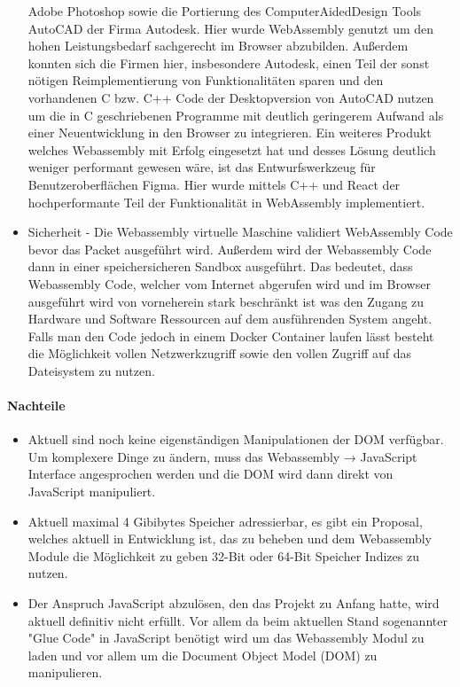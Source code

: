 \begin{itemize}
            Adobe Photoshop sowie die Portierung des ComputerAidedDesign Tools AutoCAD der Firma Autodesk. Hier wurde WebAssembly genutzt um den hohen Leistungsbedarf sachgerecht im Browser abzubilden.
            Außerdem konnten sich die Firmen hier, insbesondere Autodesk, einen Teil der sonst nötigen Reimplementierung von Funktionalitäten sparen und den vorhandenen C bzw. C++ Code der Desktopversion
            von AutoCAD nutzen um die in C geschriebenen Programme mit deutlich geringerem Aufwand als einer Neuentwicklung in den Browser zu integrieren. Ein weiteres Produkt welches Webassembly
        	mit Erfolg eingesetzt hat und desses Lösung deutlich weniger performant gewesen wäre, ist das Entwurfswerkzeug für Benutzeroberflächen Figma. Hier wurde mittels C++ und React der hochperformante Teil der Funktionalität
            in WebAssembly implementiert.
    \item   Sicherheit - Die Webassembly virtuelle Maschine validiert WebAssembly Code bevor das Packet ausgeführt wird. Außerdem wird der Webassembly Code dann in einer speichersicheren Sandbox ausgeführt.
            Das bedeutet, dass Webassembly Code, welcher vom Internet abgerufen wird und im Browser ausgeführt wird von vorneherein stark beschränkt ist was den Zugang zu Hardware und Software
            Ressourcen auf dem ausführenden System angeht. Falls man den Code jedoch in einem Docker Container laufen lässt besteht die Möglichkeit vollen Netzwerkzugriff sowie den vollen Zugriff auf das Dateisystem zu nutzen.
\end{itemize}
\paragraph*{Nachteile}
\begin{itemize}
    \item   Aktuell sind noch keine eigenständigen Manipulationen der DOM verfügbar. Um komplexere Dinge zu ändern, muss das Webassembly → JavaScript Interface angesprochen werden
            und die DOM wird dann direkt von JavaScript manipuliert.
    \item   Aktuell maximal 4 Gibibytes Speicher adressierbar, es gibt ein Proposal, welches aktuell in Entwicklung ist, das zu beheben und dem
            Webassembly Module die Möglichkeit zu geben 32-Bit oder 64-Bit Speicher Indizes zu nutzen.
    \item   Der Anspruch JavaScript abzulösen, den das Projekt zu Anfang hatte, wird aktuell definitiv nicht erfüllt. Vor allem da beim aktuellen Stand sogenannter "Glue Code" in JavaScript benötigt 
            wird um das Webassembly Modul zu laden und vor allem um die Document Object Model (DOM) zu manipulieren.
\end{itemize}
